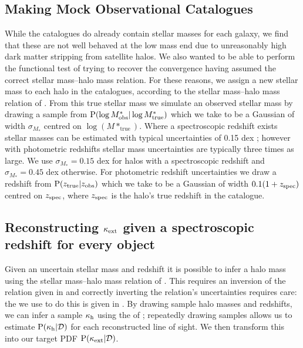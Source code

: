 \documentclass[useAMS,usenatbib,a4paper]{mn2e}
\begin{document}
\subsection{Making Mock Observational Catalogues}

While the \MS catalogues do already contain stellar masses for each galaxy, we
find that these are not well behaved at the low mass end due to unreasonably high dark matter stripping from satellite halos. We also wanted to be able to perform the functional test of
trying to recover the convergence having assumed the correct stellar
mass--halo mass relation. For these reasons, we assign a new stellar mass to
each halo in the \MS catalogues, according to the stellar mass--halo mass
relation of \citet{BehrooziEtal2010}. From this true  stellar mass we
simulate an observed stellar mass by drawing a sample from 
${\rm P}(\log{M^{*}_{\rm obs}}|\log{M^{*}_{\rm true}})$ which we take to be a
Gaussian of width $\sigma_{M_*}$ centred on $\log(M*_{\mathrm {true}})$. Where
a spectroscopic redshift exists stellar masses can be estimated with typical
uncertainties of 0.15 dex \citep{AugerEtal2009}; however with photometric
redshifts stellar mass uncertainties are typically three times as large. We
use $\sigma_{M_*}=0.15$ dex for halos with a spectroscopic redshift and
$\sigma_{M_*}=0.45$ dex otherwise. For photometric redshift uncertainties we draw a
redshift from ${\rm P}(z_{\rm true}|z_{\rm obs})$ which we take to be a Gaussian
of width $0.1(1+z_{\rm spec})$ centred on $z_{\rm spec}$, where $z_{\rm spec}$
is the halo's true redshift in the \MS catalogue.


\subsection{Reconstructing $\kappa_{\rm ext}$ given a spectroscopic redshift for every object}

Given an uncertain stellar mass and redshift it is possible to infer a
halo mass using the stellar mass--halo mass relation of
\citet{BehrooziEtal2010}. This \proceedure requires an inversion of the
relation given in \citet{BehrooziEtal2010} and correctly inverting the
relation's uncertainties requires care: the \proceedure we use to do this
is given in . By drawing sample halo masses
and redshifts, we can infer a sample $\kappa_{\rm h}$ using the \proceedure of
; repeatedly drawing samples allows us to
estimate ${\rm P}(\kappa_{\rm h}|{\mathcal{D}})$ for each reconstructed line of sight. We then
transform this into our target PDF ${\rm P}(\kappa_{\rm ext}|{\mathcal{D}})$.
\end{document}
